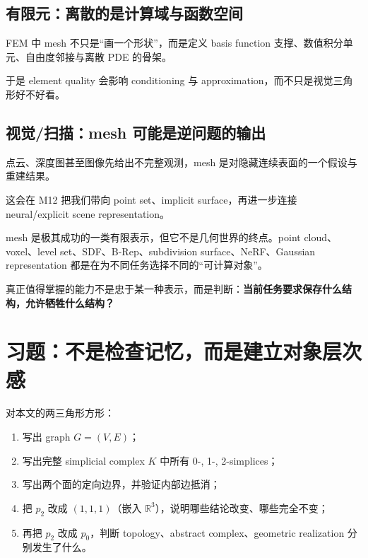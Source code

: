 \documentclass[UTF8,11pt]{ctexart}
\begin{document}
\subsection{有限元：离散的是计算域与函数空间}

FEM 中 mesh 不只是“画一个形状”，而是定义 basis function 支撑、数值积分单元、自由度邻接与离散 PDE 的骨架。

于是 element quality 会影响 conditioning 与 approximation，而不只是视觉三角形好不好看。

\subsection{视觉/扫描：mesh 可能是逆问题的输出}

点云、深度图甚至图像先给出不完整观测，mesh 是对隐藏连续表面的一个假设与重建结果。

这会在 M12 把我们带向 point set、implicit surface，再进一步连接 neural/explicit scene representation。

\begin{sidenote}
mesh 是极其成功的一类有限表示，但它不是几何世界的终点。point cloud、voxel、level set、SDF、B-Rep、subdivision surface、NeRF、Gaussian representation 都是在为不同任务选择不同的“可计算对象”。

真正值得掌握的能力不是忠于某一种表示，而是判断：\textbf{当前任务要求保存什么结构，允许牺牲什么结构？}
\end{sidenote}

\section{习题：不是检查记忆，而是建立对象层次感}

\begin{exercise}[1：把方形例子完整拆成四层]
对本文的两三角形方形：

\begin{enumerate}
  \item 写出 graph $G=(V,E)$；
  \item 写出完整 simplicial complex $K$ 中所有 0-, 1-, 2-simplices；
  \item 写出两个面的定向边界，并验证内部边抵消；
  \item 把 $p_2$ 改成 $(1,1,1)$（嵌入 $\mathbb R^3$），说明哪些结论改变、哪些完全不变；
  \item 再把 $p_2$ 改成 $p_0$，判断 topology、abstract complex、geometric realization 分别发生了什么。
\end{enumerate}
\end{exercise}
\end{document}
